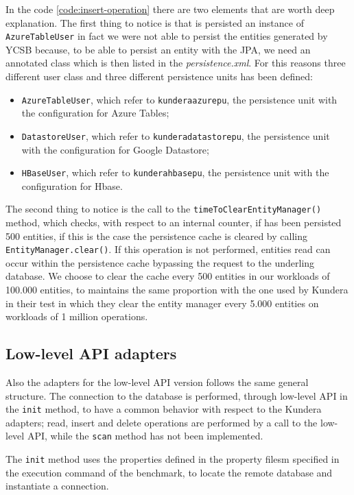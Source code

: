 \noindent In the code \ref{code:insert-operation} there are two elements that are worth deep explanation. The first thing to notice is that is persisted an instance of \texttt{AzureTableUser} in fact we were not able to persist the entities generated by YCSB because, to be able to persist an entity with the JPA, we need an annotated class which is then listed in the \textit{persistence.xml}. For this reasons three different user class and three different persistence units has been defined:
\begin{itemize}
\item \texttt{AzureTableUser}, which refer to \texttt{kundera\textunderscore azure\textunderscore pu}, the persistence unit with the configuration for Azure Tables;
\item \texttt{DatastoreUser}, which refer to \texttt{kundera\textunderscore datastore\textunderscore pu}, the persistence unit with the configuration for Google Datastore;
\item \texttt{HBaseUser}, which refer to \texttt{kundera\textunderscore hbase\textunderscore pu}, the persistence unit with the configuration for Hbase.
\end{itemize} 
\noindent The second thing to notice is the call to the \texttt{timeToClearEntityManager()} method, which checks, with respect to an internal counter, if has been persisted 500 entities, if this is the case the persistence cache is cleared by calling \texttt{EntityManager.clear()}. If this operation is not performed, entities read can occur within the persistence cache bypassing the request to the underling database. We choose to clear the cache every 500 entities in our workloads of 100.000 entities, to maintains the same proportion with the one used by Kundera in their test in which they clear the entity manager every 5.000 entities on workloads of 1 million operations.

\subsection{Low-level API adapters}
Also the adapters for the low-level API version follows the same general structure. The connection to the database is performed, through low-level API in the \texttt{init} method, to have a common behavior with respect to the Kundera adapters; read, insert and delete operations are performed by a call to the low-level API, while the \texttt{scan} method has not been implemented.

\noindent The \texttt{init} method uses the properties defined in the property filesm specified in the execution command of the benchmark, to locate the remote database and instantiate a connection.

